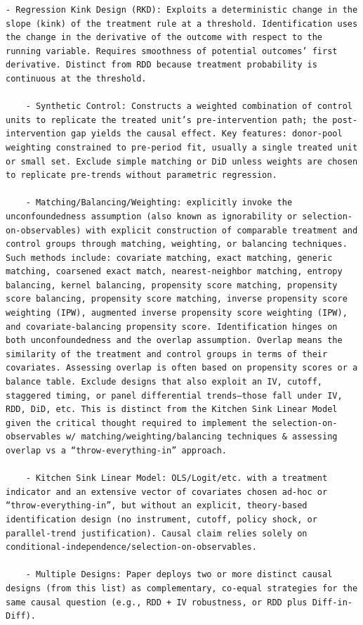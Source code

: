 \documentclass[12pt]{article}
\begin{document}
{\begin{Verbatim}[breaklines=true]
    - Regression Kink Design (RKD): Exploits a deterministic change in the slope (kink) of the treatment rule at a threshold. Identification uses the change in the derivative of the outcome with respect to the running variable. Requires smoothness of potential outcomes’ first derivative. Distinct from RDD because treatment probability is continuous at the threshold.

    - Synthetic Control: Constructs a weighted combination of control units to replicate the treated unit’s pre-intervention path; the post-intervention gap yields the causal effect. Key features: donor-pool weighting constrained to pre-period fit, usually a single treated unit or small set. Exclude simple matching or DiD unless weights are chosen to replicate pre-trends without parametric regression.

    - Matching/Balancing/Weighting: explicitly invoke the unconfoundedness assumption (also known as ignorability or selection-on-observables) with explicit construction of comparable treatment and control groups through matching, weighting, or balancing techniques. Such methods include: covariate matching, exact matching, generic matching, coarsened exact match, nearest-neighbor matching, entropy balancing, kernel balancing, propensity score matching, propensity score balancing, propensity score matching, inverse propensity score weighting (IPW), augmented inverse propensity score weighting (IPW), and covariate-balancing propensity score. Identification hinges on both unconfoundedness and the overlap assumption. Overlap means the similarity of the treatment and control groups in terms of their covariates. Assessing overlap is often based on propensity scores or a balance table. Exclude designs that also exploit an IV, cutoff, staggered timing, or panel differential trends—those fall under IV, RDD, DiD, etc. This is distinct from the Kitchen Sink Linear Model given the critical thought required to implement the selection-on-observables w/ matching/weighting/balancing techniques & assessing overlap vs a “throw-everything-in” approach.

    - Kitchen Sink Linear Model: OLS/Logit/etc. with a treatment indicator and an extensive vector of covariates chosen ad-hoc or “throw-everything-in”, but without an explicit, theory-based identification design (no instrument, cutoff, policy shock, or parallel-trend justification). Causal claim relies solely on conditional-independence/selection-on-observables.

    - Multiple Designs: Paper deploys two or more distinct causal designs (from this list) as complementary, co-equal strategies for the same causal question (e.g., RDD + IV robustness, or RDD plus Diff-in-Diff).


\end{Verbatim}}
\end{document}
